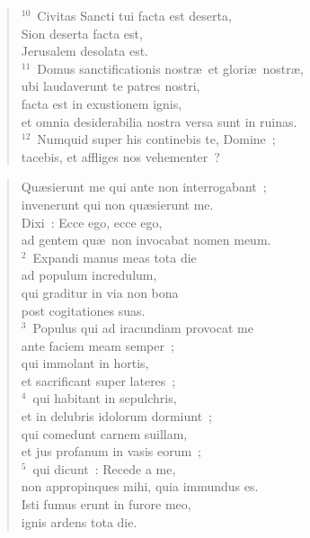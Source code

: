 \begin{flushleft}
\begin{verse}
${}^{10}$~Civitas Sancti tui facta est deserta,\\ Sion deserta facta est,\\ Jerusalem desolata est.\\
${}^{11}$~Domus sanctificationis nostr\ae\ et glori\ae\ nostr\ae ,\\ ubi laudaverunt te patres nostri,\\ facta est in exustionem ignis,\\ et omnia desiderabilia nostra versa sunt in ruinas.\\
${}^{12}$~Numquid super his continebis te, Domine~;\\ tacebis, et affliges nos vehementer~?\end{verse}\end{flushleft}


\begin{flushleft}\begin{verse}\vspace{-19pt}\hspace{6pt}Qu\ae sierunt me qui ante non interrogabant~;\\\hspace{6pt} invenerunt qui non qu\ae sierunt me.\\ Dixi~: Ecce ego, ecce ego,\\ ad gentem qu\ae\ non invocabat nomen meum.\\
${}^{2}$~Expandi manus meas tota die\\ ad populum incredulum,\\ qui graditur in via non bona\\ post cogitationes suas.\\
${}^{3}$~Populus qui ad iracundiam provocat me\\ ante faciem meam semper~;\\ qui immolant in hortis,\\ et sacrificant super lateres~;\\
${}^{4}$~qui habitant in sepulchris,\\ et in delubris idolorum dormiunt~;\\ qui comedunt carnem suillam,\\ et jus profanum in vasis eorum~;\\
${}^{5}$~qui dicunt~: Recede a me,\\ non appropinques mihi, quia immundus es.\\ Isti fumus erunt in furore meo,\\ ignis ardens tota die.\\

\end{verse}
\end{flushleft}
